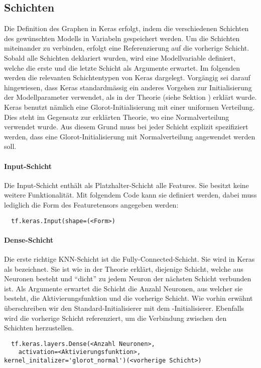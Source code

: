 \subsection{Schichten}
Die Definition des Graphen in Keras erfolgt, indem die verschiedenen Schichten
des gewünschten Modells in Variabeln gespeichert werden.
Um die Schichten miteinander zu verbinden, erfolgt eine Referenzierung auf die
vorherige Schicht.
Sobald alle Schichten deklariert wurden, wird eine Modellvariable definiert,
welche die erste und die letzte Schicht als Argumente erwartet.
\para{}
Im folgenden werden die relevanten Schichtentypen von Keras dargelegt.
\para{}
Vorgängig sei darauf hingewiesen, dass Keras standardmässig ein anderes Vorgehen
zur Initialisierung der Modellparameter verwendet, als in der Theorie (siehe
Sektion ) erklärt wurde.
Keras benutzt nämlich eine Glorot-Initialisierung mit einer uniformen Verteilung.
Dies steht im Gegensatz zur erklärten Theorie, wo eine Normalverteilung verwendet wurde.
Aus diesem Grund muss bei jeder Schicht explizit spezifiziert werden, dass eine
Glorot-Initialisierung mit Normalverteilung angewendet werden soll.

\paragraph{Input-Schicht}
Die Input-Schicht enthält als Platzhalter-Schicht alle Features. Sie besitzt keine
weitere Funktionalität. Mit folgendem Code kann sie definiert werden, dabei muss
lediglich die Form des Featuretensors angegeben werden:
\begin{verbatim}
  tf.keras.Input(shape=(<Form>)
\end{verbatim}

\paragraph{Dense-Schicht}
Die erste richtige KNN-Schicht ist die Fully-Connected-Schicht. Sie wird in
Keras als  bezeichnet. Sie ist wie in
der Theorie erklärt, diejenige Schicht, welche aus Neuronen besteht und ``dicht'' zu jedem
Neuron der nächsten Schicht verbunden ist.
Als Argumente erwartet die Schicht die Anzahl Neuronen, aus welcher sie besteht,
die Aktivierungsfunktion und die vorherige Schicht. Wie vorhin erwähnt
überschreiben wir den Standard-Initialisierer mit dem
-Initialisierer. Ebenfalls wird die vorherige Schicht
referenziert, um die Verbindung zwischen den Schichten herzustellen.
\begin{verbatim}
  tf.keras.layers.Dense(<Anzahl Neuronen>,
    activation=<Aktivierungsfunktion>, kernel_initalizer='glorot_normal')(<vorherige Schicht>)
\end{verbatim}


